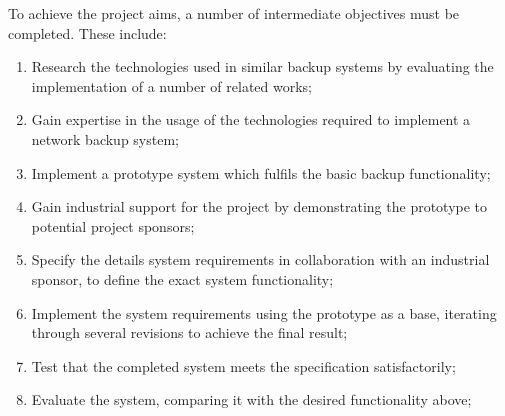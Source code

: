 To achieve the project aims, a number of intermediate objectives must be
completed. These include:

\begin{enumerate}
    \item Research the technologies used in similar backup systems by
        evaluating the implementation of a number of related works;
    \item Gain expertise in the usage of the technologies required to implement
        a network backup system;
    \item Implement a prototype system which fulfils the basic backup
        functionality;
    \item Gain industrial support for the project by demonstrating the
        prototype to potential project sponsors;
    \item Specify the details system requirements in collaboration with an
        industrial sponsor, to define the exact system functionality;
    \item Implement the system requirements using the prototype as a base,
        iterating through several revisions to achieve the final result;
    \item Test that the completed system meets the specification
        satisfactorily;
    \item Evaluate the system, comparing it with the desired functionality
        above;
\end{enumerate}
